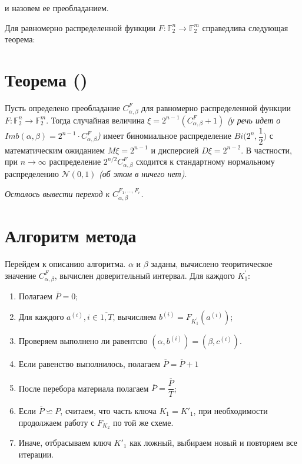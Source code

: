 \documentclass[utf8x, 14pt]{G7-32} %
\begin{document}
и назовем ее преобладанием.

Для равномерно распределенной функции $F :\mathbb{F}_2^n \to \mathbb{F}_2^m$ справедлива следующая теорема:
\section{Теорема (\cite{Daemen})}\label{theorem}

 Пусть определено преобладание $C_{\alpha, \beta}^{F}$ для равномерно распределенной функции $F: \mathbb{F}_2^n \to \mathbb{F}_2^m$. Тогда случайная величина $\xi = 2^{n-1}(C_{\alpha, \beta}^{F}+1)$ \textit{(у \cite{Daemen} речь идет о $Imb(\alpha, \beta) = 2^{n-1}\cdot C_{\alpha, \beta}^{F}$)}  имеет биномиальное распределение $Bi\big(2^n, \dfrac{1}{2}\big)$ с математическим ожиданием $M\xi = 2^{n-1}$ и дисперсией $D\xi = 2^{n-2}$. В частности, при $n\to\infty$ распределение $2^{n/2}C_{\alpha, \beta}^{F}$ сходится к стандартному нормальному распределению $\mathcal{N}(0,1)$ \textit{(об этом в \cite{Daemen} ничего нет)}.

\textit{Осталось вывести переход к $C_{\alpha, \beta}^{F_1, ..., F_r}$. }

\section{Алгоритм метода}
Перейдем к описанию алгоритма. $\alpha$ и $\beta$ заданы, вычислено теоритическое значение $C_{\alpha, \beta}^F$, вычислен доверительный интервал. Для каждого $K_1^{'}$:

\begin{enumerate}
    \item Полагаем $\overline{P} = 0$;
    \item Для каждого $a^{(i)}, i\in\overline{1,T}$, вычисляем $b^{(i)} = F_{K_1^{'}}(a^{(i)})$; 
    \item Проверяем выполнено ли равентсво $(\alpha, b^{(i)}) = (\beta, c^{(i)})$. 
    \item Если равенство выполнилось, полагаем $\overline{P} = \overline{P} + 1$
    \item После перебора материала полагаем $\overline{P} = \dfrac{\overline{P}}{T}$;
    \item Если $\overline{P} \backsimeq P$, считаем, что часть ключа $K_1 = K'_1$, при необходимости продолжаем работу с $F_{K_2}$ по той же схеме.
    \item Иначе, отбрасываем ключ $K'_1$ как ложный, выбираем новый и повторяем все итерации.
\end{enumerate}
\end{document}
